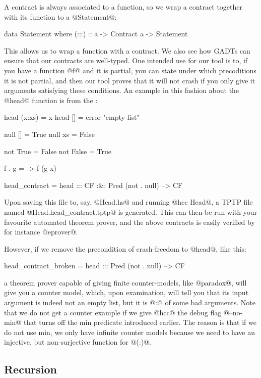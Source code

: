 A contract is always associated to a function, so we wrap a contract
together with its function to a @Statement@:

\begin{code}
data Statement where
    (:::) :: a -> Contract a -> Statement
\end{code}

This allows us to wrap a function with a contract.  We also see how
GADTs can ensure that our contracts are well-typed.  One intended use
for our tool is to, if you have a function @f@ and it is partial, you
can state under which precoditions it is not partial, and then our
tool proves that it will not crash if you only give it arguments
satisfying these conditions. An example in this fashion about the
@head@ function is from the \cite{xu+:contracts}:

\begin{code}
head (x:xs) = x
head []     = error "empty list"

null [] = True
null xs = False

not True = False
not False = True

f . g = \x -> f (g x)

head_contract =
    head ::: CF :&: Pred (not . null) --> CF
\end{code}

Upon saving this file to, say, @Head.hs@ and running @hcc Head@, a
TPTP file named @Head.head_contract.tptp@ is generated. This can then
be run with your favourite automated theorem prover, and the above
contracts is easily verified by for instance @eprover@.

However, if we remove the precondition of crash-freedom to @head@,
like this:

\begin{code}
head_contract_broken =
    head ::: Pred (not . null) --> CF
\end{code}

a theorem prover capable of giving finite counter-models, like @paradox@,
will give you a counter model, which, upon examination, will tell you
that its input argument is indeed not an empty list, but it is @:@ of
some bad arguments. Note that we do not get a counter example if we
give @hcc@ the debug flag @--no-min@ that turns off the min predicate
introduced earlier. The reason is that if we do not use min, we only
have infinite counter models because we need to have an injective, but
non-surjective function for @(:)@.

\subsection{Recursion}

